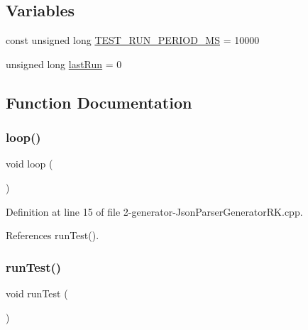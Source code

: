 \subsection*{Variables}
\begin{DoxyCompactItemize}
\item 
const unsigned long \hyperlink{2-generator-_json_parser_generator_r_k_8cpp_a0aa12824a9c1a44e8d9f2499e0ba2698}{T\+E\+S\+T\+\_\+\+R\+U\+N\+\_\+\+P\+E\+R\+I\+O\+D\+\_\+\+MS} = 10000
\item 
unsigned long \hyperlink{2-generator-_json_parser_generator_r_k_8cpp_a5082951a06f690a0623ea99ed4228392}{last\+Run} = 0
\end{DoxyCompactItemize}


\subsection{Function Documentation}
\mbox{\label{2-generator-_json_parser_generator_r_k_8cpp_afe461d27b9c48d5921c00d521181f12f}} 
\subsubsection{\texorpdfstring{loop()}{loop()}}
{\footnotesize\ttfamily void loop (\begin{DoxyParamCaption}{ }\end{DoxyParamCaption})}



Definition at line 15 of file 2-\/generator-\/\+Json\+Parser\+Generator\+R\+K.\+cpp.



References run\+Test().

\mbox{\label{2-generator-_json_parser_generator_r_k_8cpp_a822f652c6fc2f163c182a6e5fe922c23}} 
\subsubsection{\texorpdfstring{run\+Test()}{runTest()}}
{\footnotesize\ttfamily void run\+Test (\begin{DoxyParamCaption}{ }\end{DoxyParamCaption})}



